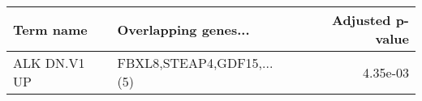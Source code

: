 \begin{tabular}{llr}
\toprule
   Term name &      Overlapping genes... &  Adjusted p-value \\
\midrule
ALK DN.V1 UP & FBXL8,STEAP4,GDF15,...(5) &          4.35e-03 \\
\bottomrule
\end{tabular}
